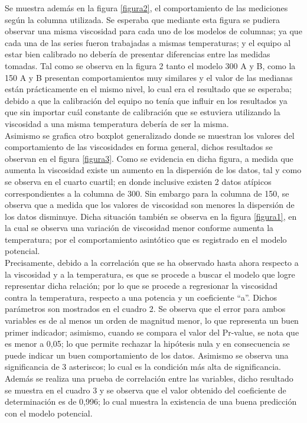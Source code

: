 \documentclass[12, letterpaper]{article}
\begin{document}
Se muestra además en la figura \ref{figura2}, el comportamiento de las mediciones según la columna utilizada. Se esperaba que mediante esta figura se pudiera observar una misma viscosidad para cada uno de los modelos de columnas; ya que cada una de las series fueron trabajadas a mismas temperaturas; y el equipo al estar bien calibrado no debería de presentar diferencias entre las medidas tomadas. Tal como se observa en la figura 2 tanto el modelo 300 A y B, como la 150 A y B presentan comportamientos muy similares y el valor de las medianas están prácticamente en el mismo nivel, lo cual era el resultado que se esperaba; debido a que la calibración del equipo no tenía que  influir en los resultados ya que sin importar cuál constante de calibración que se estuviera utilizando la viscosidad a una misma temperatura debería de ser la misma.\\ 
Asimismo se grafica otro boxplot generalizado donde se muestran los valores del comportamiento de las viscosidades en forma general, dichos resultados se observan en el figura \ref{figura3}. Como se evidencia en dicha figura, a medida que aumenta la viscosidad existe un aumento en la dispersión de los datos, tal y como se observa en el cuarto cuartil; en donde inclusive existen 2 datos atípicos correspondientes a la columna de 300. Sin embargo para la columna de 150, se observa que a medida que los valores de viscosidad son menores la dispersión de los datos disminuye. Dicha situación también se observa en la figura \ref{figura1}, en la cual se observa una variación de viscosidad menor conforme aumenta la temperatura; por el comportamiento asintótico que es registrado en el modelo potencial.\\ 
Precisamente, debido a la correlación que se ha observado hasta ahora respecto a la viscosidad y a la temperatura, es que se procede a buscar el modelo que logre representar dicha relación; por lo que se procede a regresionar la viscosidad contra la temperatura, respecto a una potencia y un coeficiente “a”. Dichos parámetros son mostrados en el cuadro 2. Se observa que el error para ambos variables es de al menos un orden de magnitud menor, lo que representa un buen primer indicador; asimismo, cuando se compara el valor del Pr-value, se nota que es menor a 0,05; lo que permite rechazar la hipótesis nula y en consecuencia se puede indicar un buen comportamiento de los datos. Asimismo se observa una significancia de 3 asteriscos; lo cual es la condición más alta de significancia. Además se realiza una prueba de correlación entre las variables, dicho resultado se muestra en el cuadro 3 y se observa que el valor obtenido del coeficiente de determinación es de 0,996; lo cual muestra la existencia de una buena predicción con el modelo potencial.\\ 
\end{document}

